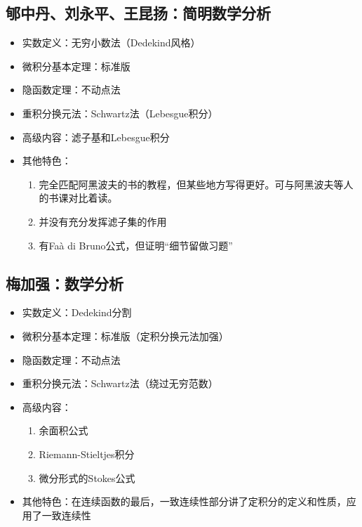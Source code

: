 \documentclass[UTF8]{article}
\begin{document}
    \subsection{郇中丹、刘永平、王昆扬：简明数学分析}
    \begin{itemize}
        \item 实数定义：无穷小数法（Dedekind风格）
        \item 微积分基本定理：标准版
        \item 隐函数定理：不动点法
        \item 重积分换元法：Schwartz法（Lebesgue积分）
        \item 高级内容：滤子基和Lebesgue积分
        \item 其他特色：\begin{enumerate}
            \item 完全匹配阿黑波夫的书的教程，但某些地方写得更好。可与阿黑波夫等人的书课对比着读。
            \item 并没有充分发挥滤子集的作用
            \item 有Faà di Bruno公式，但证明``细节留做习题''
        \end{enumerate}
    \end{itemize}
    \subsection{梅加强：数学分析}
    \begin{itemize}
        \item 实数定义：Dedekind分割
        \item 微积分基本定理：标准版（定积分换元法加强）
        \item 隐函数定理：不动点法
        \item 重积分换元法：Schwartz法（绕过无穷范数）
        \item 高级内容：\begin{enumerate}
            \item 余面积公式
            \item Riemann-Stieltjes积分
            \item 微分形式的Stokes公式
        \end{enumerate}
        \item 其他特色：在连续函数的最后，一致连续性部分讲了定积分的定义和性质，应用了一致连续性
    \end{itemize}
\end{document}
